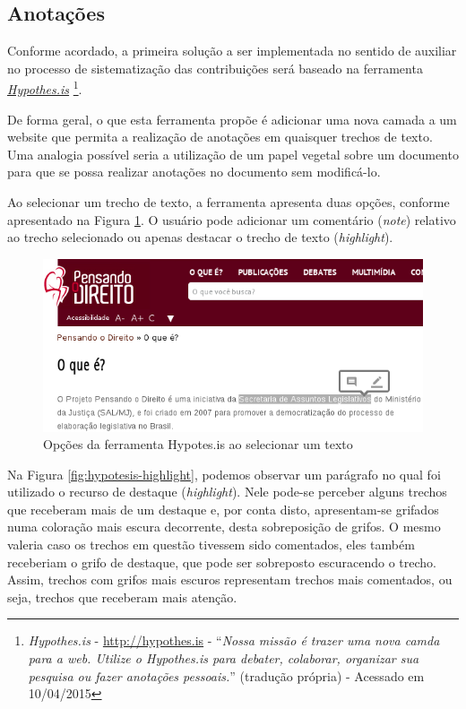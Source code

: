 \subsection{Anotações\label{sec:anotacoes}}
Conforme acordado, a primeira solução a ser implementada no sentido de auxiliar no processo de sistematização das contribuições será baseado na ferramenta \href{http://hypothes.is}{\textit{Hypothes.is}}%
\footnote{\textit{Hypothes.is} - \url{http://hypothes.is} - ``\textit{Nossa missão é trazer uma nova camda para a web. Utilize o Hypothes.is para debater, colaborar, organizar sua pesquisa ou fazer anotações pessoais.}'' (tradução própria) - Acessado em 10/04/2015}.

De forma geral, o que esta ferramenta propõe é adicionar uma nova camada a um website que permita a realização de anotações em quaisquer trechos de texto. Uma analogia possível seria a utilização de um papel vegetal sobre um documento para que se possa realizar anotações no documento sem modificá-lo.

Ao selecionar um trecho de texto, a ferramenta apresenta duas opções, conforme apresentado na Figura \ref{fig:hypotesis-opcoes}. O usuário pode adicionar um comentário (\textit{note}) relativo ao trecho selecionado ou apenas destacar o trecho de texto (\textit{highlight}).

    \begin{figure}[htb]%
        \begin{center}
            \includegraphics[scale=0.7]{./imagens/hypotesis-opcoes.png}%
        \end{center}%
        \caption{Opções da ferramenta Hypotes.is ao selecionar um texto\label{fig:hypotesis-opcoes}}%
    \end{figure}%
    
Na Figura \ref{fig:hypotesis-highlight}, podemos observar um parágrafo no qual foi utilizado o recurso de destaque (\textit{highlight}). Nele pode-se perceber alguns trechos que receberam mais de um destaque e, por conta disto, apresentam-se grifados numa coloração mais escura decorrente, desta sobreposição de grifos. O mesmo valeria caso os trechos em questão tivessem sido comentados, eles também receberiam o grifo de destaque, que pode ser sobreposto escuracendo o trecho. Assim, trechos com grifos mais escuros representam trechos mais comentados, ou seja, trechos que receberam mais atenção.

